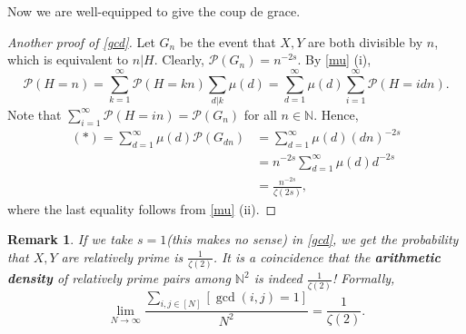 \documentclass[12pt]{article}
\newtheorem*{remark}{Remark}
\newcommand\N{\mathbb{N}}
\newcommand\pp{\mathcal{P}}
\begin{document}
Now we are well-equipped to give the coup de grace. 
\begin{proof}[Another proof of \cref{gcd}]
    Let $G_n$ be the event that $X,Y$ are both divisible by $n$,
    which is equivalent to $n | H$.
    Clearly, $\pp(G_n) = n^{-2s}$.
    By \cref{mu} (i), 
    \begin{equation}
        \tag{*}
        \pp(H = n) = \sum_{k = 1}^\infty \pp(H = kn) \sum_{d | k} \mu(d) 
        = \sum_{d = 1}^{\infty} \mu(d) \sum_{i = 1}^{\infty} \pp(H = idn).    
    \end{equation}
    Note that $\sum_{i = 1}^{\infty} \pp(H = in) = \pp(G_n)$ for all $n \in \N$.
    Hence, 
    \begin{align*}
        (*) = \sum_{d = 1}^{\infty} \mu(d) \pp(G_{dn}) 
        &= \sum_{d = 1}^{\infty} \mu(d) (dn)^{-2s} \\
        &= n^{-2s} \sum_{d = 1}^{\infty}  \mu(d) d^{-2s} \\
        &= \frac{n^{-2s}}{\zeta(2s)},
    \end{align*}
    where the last equality follows from \cref{mu} (ii).
\end{proof}

\begin{remark}
    If we take $s = 1$(this makes no sense) in \cref{gcd}, we get 
    the probability that $X,Y$ are relatively prime is $\frac{1}{\zeta(2)}$.
    It is a coincidence that the \textbf{arithmetic density} of relatively prime pairs 
    among $\N^2$ is indeed $\frac{1}{\zeta(2)}$! Formally, 
    $$
        \lim_{N \to \infty} \frac{\sum_{i,j \in [N]}[\gcd(i,j) = 1]}{N^2} = \frac{1}{\zeta(2)}.
    $$    
\end{remark}
\end{document}
